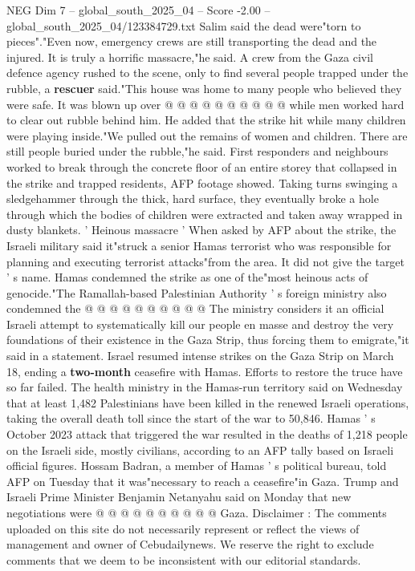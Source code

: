 \begin{textsample}{NEG Dim 7 – global\_south\_2025\_04 – Score -2.00 – global\_south\_2025\_04/123384729.txt}
Salim said the dead were"torn to pieces"."Even now, emergency crews are still transporting the dead and the injured.
It is truly a horrific massacre,"he said.
A crew from the Gaza civil defence agency rushed to the scene, only to find several people trapped under the rubble, a \textbf{rescuer} said."This house was home to many people who believed they were safe.
It was blown up over @ @ @ @ @ @ @ @ @ @ while men worked hard to clear out rubble behind him.
He added that the strike hit while many children were playing inside."We pulled out the remains of women and children.
There are still people buried under the rubble,"he said.
First responders and neighbours worked to break through the concrete floor of an entire storey that collapsed in the strike and trapped residents, AFP footage showed.
Taking turns swinging a sledgehammer through the thick, hard surface, they eventually broke a hole through which the bodies of children were extracted and taken away wrapped in dusty blankets. ' Heinous massacre ' When asked by AFP about the strike, the Israeli military said it"struck a senior Hamas terrorist who was responsible for planning and executing terrorist attacks"from the area.
It did not give the target ' s name.
Hamas condemned the strike as one of the"most heinous acts of genocide."The Ramallah-based Palestinian Authority ' s foreign ministry also condemned the @ @ @ @ @ @ @ @ @ @ The ministry considers it an official Israeli attempt to systematically kill our people en masse and destroy the very foundations of their existence in the Gaza Strip, thus forcing them to emigrate,"it said in a statement.
Israel resumed intense strikes on the Gaza Strip on March 18, ending a \textbf{two-month} ceasefire with Hamas.
Efforts to restore the truce have so far failed.
The health ministry in the Hamas-run territory said on Wednesday that at least 1,482 Palestinians have been killed in the renewed Israeli operations, taking the overall death toll since the start of the war to 50,846.
Hamas ' s October 2023 attack that triggered the war resulted in the deaths of 1,218 people on the Israeli side, mostly civilians, according to an AFP tally based on Israeli official figures.
Hossam Badran, a member of Hamas ' s political bureau, told AFP on Tuesday that it was"necessary to reach a ceasefire"in Gaza.
Trump and Israeli Prime Minister Benjamin Netanyahu said on Monday that new negotiations were @ @ @ @ @ @ @ @ @ @ Gaza.
Disclaimer : The comments uploaded on this site do not necessarily represent or reflect the views of management and owner of Cebudailynews.
We reserve the right to exclude comments that we deem to be inconsistent with our editorial standards.

\end{textsample}

